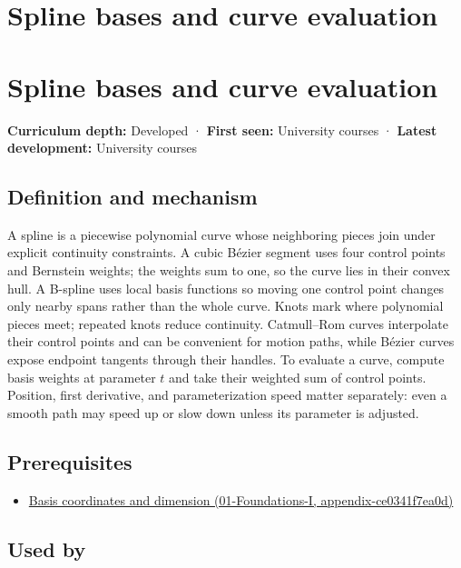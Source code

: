 \hypertarget{appendix-f28eeec97a3d}{}
\section*{Spline bases and curve evaluation}
\section{Spline bases and curve evaluation}\label{spline-bases-and-curve-evaluation}

\textbf{Curriculum depth:} Developed · \textbf{First seen:} University courses · \textbf{Latest development:} University courses

\subsection{Definition and mechanism}\label{definition-and-mechanism}

A spline is a piecewise polynomial curve whose neighboring pieces join under explicit continuity constraints. A cubic Bézier segment uses four control points and Bernstein weights; the weights sum to one, so the curve lies in their convex hull. A B-spline uses local basis functions so moving one control point changes only nearby spans rather than the whole curve. Knots mark where polynomial pieces meet; repeated knots reduce continuity. Catmull--Rom curves interpolate their control points and can be convenient for motion paths, while Bézier curves expose endpoint tangents through their handles. To evaluate a curve, compute basis weights at parameter \(t\) and take their weighted sum of control points. Position, first derivative, and parameterization speed matter separately: even a smooth path may speed up or slow down unless its parameter is adjusted.

\subsection{Prerequisites}\label{prerequisites}

\begin{itemize}
\tightlist
\item
  \href{}{Basis coordinates and dimension (01-Foundations-I, appendix-ce0341f7ea0d)}
\end{itemize}

\subsection{Used by}\label{used-by}

